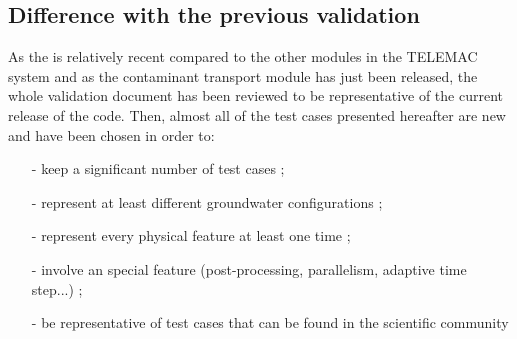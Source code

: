 \subsection{Difference with the previous validation}
As the \estel is relatively recent compared to the other modules in the TELEMAC system and
as the contaminant transport module has just been released,
the whole validation document has been reviewed to be representative of the current release of the \estel code.
Then, almost all of the test cases presented hereafter are new and have been chosen in order to:
\begin{itemize}
\item [-] keep a significant number of test cases ;
\item [-] represent at least different groundwater configurations ;
\item [-] represent every physical feature at least one time ;
\item [-] involve an \estel special feature (post-processing, parallelism, adaptive time step...) ;
\item [-] be representative of test cases that can be found in the scientific community
\end{itemize}

% 

